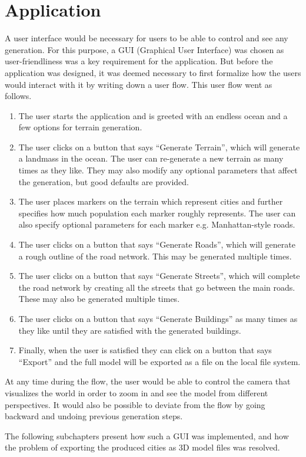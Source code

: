 \section{Application}

A user interface would be necessary for users to be able to control and see any generation.
For this purpose, a GUI (Graphical User Interface) was chosen as user-friendliness was a key requirement for the application.
But before the application was designed, it was deemed necessary to first formalize how the users would interact with it by writing down a user flow.
This user flow went as follows.

\begin{enumerate}
\item The user starts the application and is greeted with an endless ocean and a few options for terrain generation.
\item The user clicks on a button that says “Generate Terrain”, which will generate a landmass in the ocean. The user can re-generate a new terrain as many times as they like. They may also modify any optional parameters that affect the generation, but good defaults are provided.
\item The user places markers on the terrain which represent cities and further specifies how much population each marker roughly represents. The user can also specify optional parameters for each marker e.g. Manhattan-style roads.
\item The user clicks on a button that says “Generate Roads”, which will generate a rough outline of the road network. This may be generated multiple times.
\item The user clicks on a button that says “Generate Streets”, which will complete the road network by creating all the streets that go between the main roads. These may also be generated multiple times.
\item The user clicks on a button that says “Generate Buildings” as many times as they like until they are satisfied with the generated buildings.
\item Finally, when the user is satisfied they can click on a button that says “Export” and the full model will be exported as a file on the local file system.
\end{enumerate}

At any time during the flow, the user would be able to control the camera that visualizes the world in order to zoom in and see the model from different perspectives.
It would also be possible to deviate from the flow by going backward and undoing previous generation steps.

The following subchapters present how such a GUI was implemented, and how the problem of exporting the produced cities as 3D model files was resolved.


